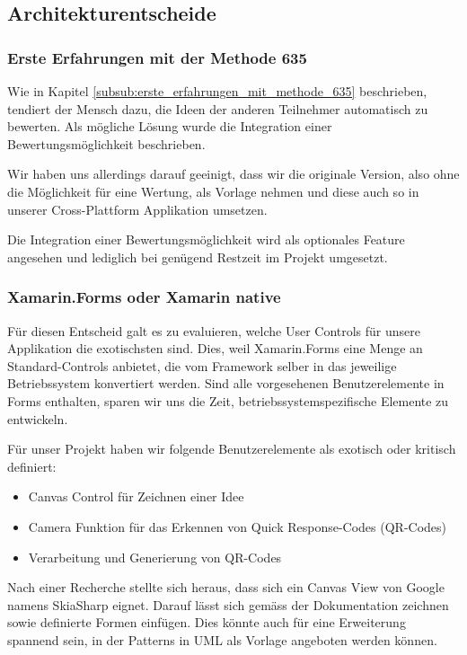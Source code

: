 \subsection{Architekturentscheide}

\subsubsection{Erste Erfahrungen mit der Methode 635}
Wie in Kapitel \ref{subsub:erste_erfahrungen_mit_methode_635} beschrieben, tendiert der Mensch dazu, die Ideen der anderen Teilnehmer automatisch zu bewerten. Als mögliche Lösung wurde die Integration einer Bewertungsmöglichkeit beschrieben.


Wir haben uns allerdings darauf geeinigt, dass wir die originale Version, also ohne die Möglichkeit für eine Wertung, als Vorlage nehmen und diese auch so in unserer Cross-Plattform Applikation umsetzen. 


Die Integration einer Bewertungsmöglichkeit wird als optionales Feature angesehen und lediglich bei genügend Restzeit im Projekt umgesetzt.

\subsubsection{Xamarin.Forms oder Xamarin native}
Für diesen Entscheid galt es zu evaluieren, welche User Controls für unsere Applikation die exotischsten sind. Dies, weil Xamarin.Forms eine Menge an Standard-Controls anbietet, die vom Framework selber in das jeweilige Betriebssystem konvertiert werden. Sind alle vorgesehenen Benutzerelemente in Forms enthalten, sparen wir uns die Zeit, betriebssystemspezifische Elemente zu entwickeln. 

Für unser Projekt haben wir folgende Benutzerelemente als exotisch oder kritisch definiert:
\begin{itemize}
	\item Canvas Control für Zeichnen einer Idee
	\item Camera Funktion für das Erkennen von Quick Response-Codes (QR-Codes)
	\item Verarbeitung und Generierung von QR-Codes
\end{itemize}

Nach einer Recherche stellte sich heraus, dass sich ein Canvas View von Google namens SkiaSharp \cite{skiaSharp} eignet. Darauf lässt sich gemäss der Dokumentation zeichnen sowie definierte Formen einfügen. Dies könnte auch für eine Erweiterung spannend sein, in der Patterns in UML als Vorlage angeboten werden können.


